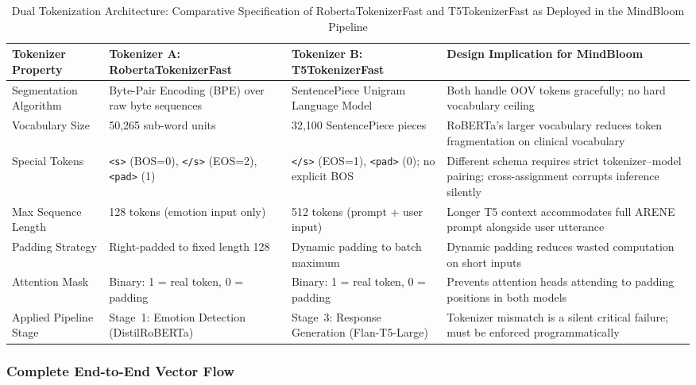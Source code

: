 \documentclass[12pt,twoside]{article}
\begin{document}
\begin{table}[htbp]
\centering
\Large
\renewcommand{\arraystretch}{2.4}
\setlength{\tabcolsep}{12pt}
\begin{adjustbox}{max width=\textwidth, max totalheight=0.82\textheight}
\begin{tabular}{|p{3.2cm}|p{4.5cm}|p{4.5cm}|p{4.5cm}|}
\hline
\rowcolor{gray!20}
\textbf{Tokenizer Property} & \textbf{Tokenizer A: RobertaTokenizerFast} & \textbf{Tokenizer B: T5TokenizerFast} & \textbf{Design Implication for MindBloom} \\
\hline
Segmentation Algorithm & Byte-Pair Encoding (BPE) over raw byte sequences & SentencePiece Unigram Language Model & Both handle OOV tokens gracefully; no hard vocabulary ceiling \\
\hline
Vocabulary Size & 50,265 sub-word units & 32,100 SentencePiece pieces & RoBERTa's larger vocabulary reduces token fragmentation on clinical vocabulary \\
\hline
Special Tokens & \texttt{<s>} (BOS=0), \texttt{</s>} (EOS=2), \texttt{<pad>} (1) & \texttt{</s>} (EOS=1), \texttt{<pad>} (0); no explicit BOS & Different schema requires strict tokenizer--model pairing; cross-assignment corrupts inference silently \\
\hline
Max Sequence Length & 128 tokens (emotion input only) & 512 tokens (prompt + user input) & Longer T5 context accommodates full ARENE prompt alongside user utterance \\
\hline
Padding Strategy & Right-padded to fixed length 128 & Dynamic padding to batch maximum & Dynamic padding reduces wasted computation on short inputs \\
\hline
Attention Mask & Binary: 1 = real token, 0 = padding & Binary: 1 = real token, 0 = padding & Prevents attention heads attending to padding positions in both models \\
\hline
Applied Pipeline Stage & Stage~1: Emotion Detection (DistilRoBERTa) & Stage~3: Response Generation (Flan-T5-Large) & Tokenizer mismatch is a silent critical failure; must be enforced programmatically \\
\hline
\end{tabular}
\end{adjustbox}
\caption{Dual Tokenization Architecture: Comparative Specification of RobertaTokenizerFast and T5TokenizerFast as Deployed in the MindBloom Pipeline}
\label{tab:tokenizers}
\end{table}

\subsubsection{Complete End-to-End Vector Flow}
\end{document}
